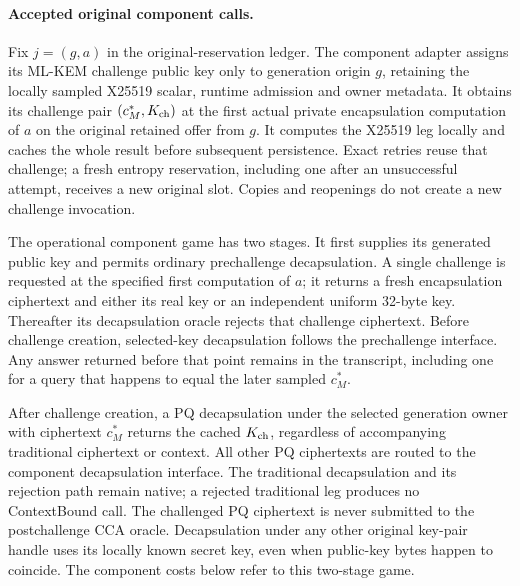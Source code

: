 \documentclass[pdflatex]{sn-jnl}
\theoremstyle{thmstyleone}
\theoremstyle{thmstylethree}
\theoremstyle{thmstyletwo}
\begin{document}
\paragraph{Accepted original component calls.}
Fix $j=(g,a)$ in the original-reservation ledger. The component
adapter assigns its ML-KEM challenge public key only to generation origin
$g$, retaining the locally sampled X25519 scalar, runtime admission and
owner metadata. It obtains its challenge pair $(c_M^*,K_{\rm ch})$ at the
first actual private encapsulation computation of $a$ on the original
retained offer from $g$. It computes the X25519 leg locally and caches the
whole result before subsequent persistence. Exact retries reuse that
challenge; a fresh entropy reservation, including one after an unsuccessful
attempt, receives a new original slot. Copies and reopenings do
not create a new challenge invocation.

The operational component game has two stages. It first supplies its
generated public key and permits ordinary prechallenge decapsulation.
A single challenge is requested at the specified first computation of
$a$; it returns a fresh encapsulation ciphertext and either its real key
or an independent uniform 32-byte key. Thereafter its decapsulation
oracle rejects that challenge ciphertext. Before challenge creation,
selected-key decapsulation follows the prechallenge interface. Any answer
returned before that point remains in the transcript, including one for a
query that happens to equal the later sampled $c_M^*$.

After challenge creation, a PQ decapsulation under the selected generation
owner with ciphertext $c_M^*$ returns the cached $K_{\rm ch}$, regardless
of accompanying traditional ciphertext or context. All other PQ
ciphertexts are routed to the component decapsulation interface. The
traditional decapsulation and its rejection path remain native; a rejected
traditional leg produces no ContextBound call. The challenged PQ
ciphertext is never submitted to the postchallenge CCA oracle. Decapsulation
under any other original key-pair handle uses its locally known secret key,
even when public-key bytes happen to coincide. The component costs below
refer to this two-stage game.
\end{document}
